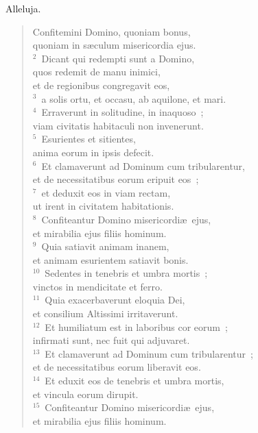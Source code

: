 \bchapter
\lettrine[lines=3,image=true,loversize=0.05,lraise=-0.03]{A}{}lleluja. \begin{flushleft}\begin{verse}\vspace{6pt}Confitemini Domino, quoniam bonus,\\ quoniam in s\ae culum misericordia ejus.\\
${}^{2}$~Dicant qui redempti sunt a Domino,\\ quos redemit de manu inimici,\\ et de regionibus congregavit eos,\\
${}^{3}$~a solis ortu, et occasu, ab aquilone, et mari.\\
${}^{4}$~Erraverunt in solitudine, in inaquoso~;\\ viam civitatis habitaculi non invenerunt.\\
${}^{5}$~Esurientes et sitientes,\\ anima eorum in ipsis defecit.\\
${}^{6}$~Et clamaverunt ad Dominum cum tribularentur,\\ et de necessitatibus eorum eripuit eos~;\\
${}^{7}$~et deduxit eos in viam rectam,\\ ut irent in civitatem habitationis.\\
${}^{8}$~Confiteantur Domino misericordi\ae\ ejus,\\ et mirabilia ejus filiis hominum.\\
${}^{9}$~Quia satiavit animam inanem,\\ et animam esurientem satiavit bonis.\\
${}^{10}$~Sedentes in tenebris et umbra mortis~;\\ vinctos in mendicitate et ferro.\\
${}^{11}$~Quia exacerbaverunt eloquia Dei,\\ et consilium Altissimi irritaverunt.\\
${}^{12}$~Et humiliatum est in laboribus cor eorum~;\\ infirmati sunt, nec fuit qui adjuvaret.\\
${}^{13}$~Et clamaverunt ad Dominum cum tribularentur~;\\ et de necessitatibus eorum liberavit eos.\\
${}^{14}$~Et eduxit eos de tenebris et umbra mortis,\\ et vincula eorum dirupit.\\
${}^{15}$~Confiteantur Domino misericordi\ae\ ejus,\\ et mirabilia ejus filiis hominum.\\

\end{verse}
\end{flushleft}
